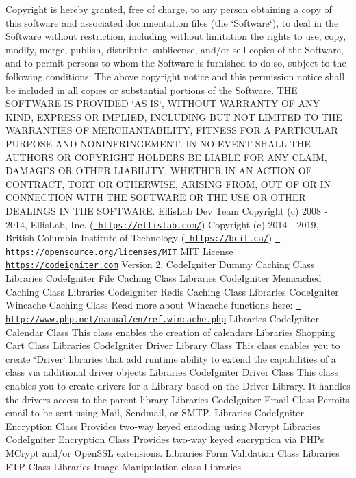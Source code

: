 \begin{DoxyCopyright}{Copyright}
is hereby granted, free of charge, to any person obtaining a copy of this software and associated documentation files (the \char`\"{}\+Software\char`\"{}), to deal in the Software without restriction, including without limitation the rights to use, copy, modify, merge, publish, distribute, sublicense, and/or sell copies of the Software, and to permit persons to whom the Software is furnished to do so, subject to the following conditions\+: The above copyright notice and this permission notice shall be included in all copies or substantial portions of the Software. T\+HE S\+O\+F\+T\+W\+A\+RE IS P\+R\+O\+V\+I\+D\+ED \char`\"{}\+A\+S I\+S\char`\"{}, W\+I\+T\+H\+O\+UT W\+A\+R\+R\+A\+N\+TY OF A\+NY K\+I\+ND, E\+X\+P\+R\+E\+SS OR I\+M\+P\+L\+I\+ED, I\+N\+C\+L\+U\+D\+I\+NG B\+UT N\+OT L\+I\+M\+I\+T\+ED TO T\+HE W\+A\+R\+R\+A\+N\+T\+I\+ES OF M\+E\+R\+C\+H\+A\+N\+T\+A\+B\+I\+L\+I\+TY, F\+I\+T\+N\+E\+SS F\+OR A P\+A\+R\+T\+I\+C\+U\+L\+AR P\+U\+R\+P\+O\+SE A\+ND N\+O\+N\+I\+N\+F\+R\+I\+N\+G\+E\+M\+E\+NT. IN NO E\+V\+E\+NT S\+H\+A\+LL T\+HE A\+U\+T\+H\+O\+RS OR C\+O\+P\+Y\+R\+I\+G\+HT H\+O\+L\+D\+E\+RS BE L\+I\+A\+B\+LE F\+OR A\+NY C\+L\+A\+IM, D\+A\+M\+A\+G\+ES OR O\+T\+H\+ER L\+I\+A\+B\+I\+L\+I\+TY, W\+H\+E\+T\+H\+ER IN AN A\+C\+T\+I\+ON OF C\+O\+N\+T\+R\+A\+CT, T\+O\+RT OR O\+T\+H\+E\+R\+W\+I\+SE, A\+R\+I\+S\+I\+NG F\+R\+OM, O\+UT OF OR IN C\+O\+N\+N\+E\+C\+T\+I\+ON W\+I\+TH T\+HE S\+O\+F\+T\+W\+A\+RE OR T\+HE U\+SE OR O\+T\+H\+ER D\+E\+A\+L\+I\+N\+GS IN T\+HE S\+O\+F\+T\+W\+A\+RE.  Ellis\+Lab Dev Team  Copyright (c) 2008 -\/ 2014, Ellis\+Lab, Inc. (\href{https://ellislab.com/}{\texttt{ https\+://ellislab.\+com/}})  Copyright (c) 2014 -\/ 2019, British Columbia Institute of Technology (\href{https://bcit.ca/}{\texttt{ https\+://bcit.\+ca/}})  \href{https://opensource.org/licenses/MIT}{\texttt{ https\+://opensource.\+org/licenses/\+M\+IT}} M\+IT License  \href{https://codeigniter.com}{\texttt{ https\+://codeigniter.\+com}}  Version 2.  Code\+Igniter Dummy Caching Class  Libraries Code\+Igniter File Caching Class  Libraries Code\+Igniter Memcached Caching Class  Libraries Code\+Igniter Redis Caching Class  Libraries Code\+Igniter Wincache Caching Class Read more about Wincache functions here\+: \href{http://www.php.net/manual/en/ref.wincache.php}{\texttt{ http\+://www.\+php.\+net/manual/en/ref.\+wincache.\+php}}  Libraries Code\+Igniter Calendar Class This class enables the creation of calendars  Libraries Shopping Cart Class  Libraries Code\+Igniter Driver Library Class This class enables you to create \char`\"{}\+Driver\char`\"{} libraries that add runtime ability to extend the capabilities of a class via additional driver objects  Libraries Code\+Igniter Driver Class This class enables you to create drivers for a Library based on the Driver Library. It handles the drivers\textquotesingle{} access to the parent library  Libraries Code\+Igniter Email Class Permits email to be sent using Mail, Sendmail, or S\+M\+TP.  Libraries Code\+Igniter Encryption Class Provides two-\/way keyed encoding using Mcrypt  Libraries Code\+Igniter Encryption Class Provides two-\/way keyed encryption via P\+HP\textquotesingle{}s M\+Crypt and/or Open\+S\+SL extensions.  Libraries Form Validation Class  Libraries F\+TP Class  Libraries Image Manipulation class  Libraries 
\end{DoxyCopyright}
